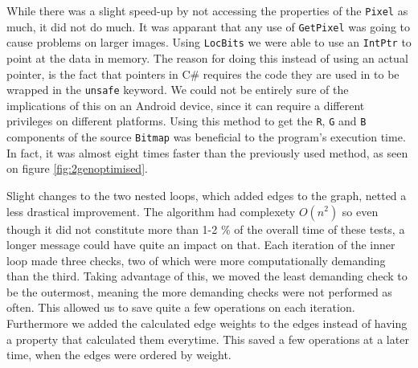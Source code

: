 While there was a slight speed-up by not accessing the properties of the \lstinline|Pixel| as much, it did not do much.
It was apparant that any use of \lstinline|GetPixel| was going to cause problems on larger images.
Using \lstinline|LocBits| we were able to use an \lstinline|IntPtr| to point at the data in memory.\citep{MSDNIntPtr}
The reason for doing this instead of using an actual pointer, is the fact that pointers in C\# requires the code they are used in to be wrapped in the \lstinline|unsafe| keyword. 
We could not be entirely sure of the implications of this on an Android device, since it can require a different privileges on different platforms.
Using this method to get the \lstinline|R|, \lstinline|G| and \lstinline|B| components of the source \lstinline|Bitmap| was beneficial to the program's execution time.
In fact, it was almost eight times faster than the previously used method, as seen on figure \ref{fig:2genoptimised}.

Slight changes to the two nested loops, which added edges to the graph, netted a less drastical improvement.
The algorithm had complexety $O(n^2)$ so even though it did not constitute more than 1-2 \% of the overall time of these tests, a longer message could have quite an impact on that.
Each iteration of the inner loop made three checks, two of which were more computationally demanding than the third.
Taking advantage of this, we moved the least demanding check to be the outermost, meaning the more demanding checks were not performed as often.
This allowed us to save quite a few operations on each iteration. 
Furthermore we added the calculated edge weights to the edges instead of having a property that calculated them everytime. 
This saved a few operations at a later time, when the edges were ordered by weight.


